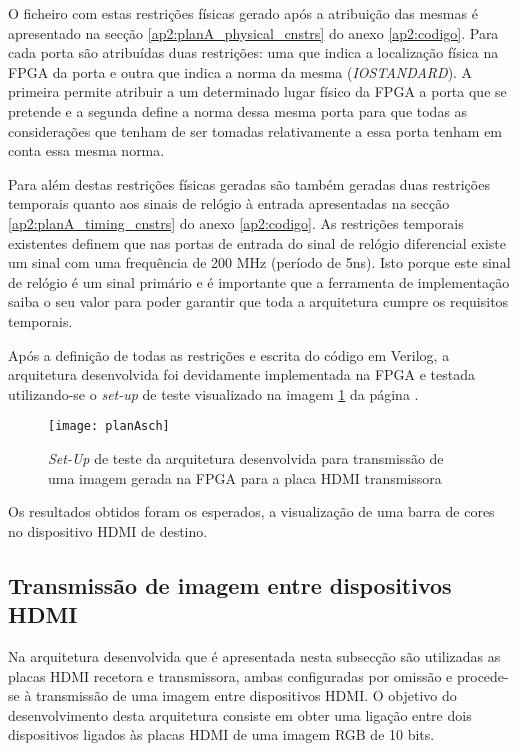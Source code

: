 O ficheiro com estas restrições físicas gerado após a atribuição das mesmas é apresentado na secção \ref{ap2:planA_physical_cnstrs} do anexo \ref{ap2:codigo}. Para cada porta são atribuídas duas restrições: uma que indica a localização física na FPGA da porta e outra que indica a norma da mesma (\textit{IOSTANDARD}). A primeira permite atribuir a um determinado lugar físico da FPGA a porta que se pretende e a segunda define a norma dessa mesma porta para que todas as considerações que tenham de ser tomadas relativamente a essa porta tenham em conta essa mesma norma.

Para além destas restrições físicas geradas são também geradas duas restrições temporais quanto aos sinais de relógio à entrada apresentadas na secção \ref{ap2:planA_timing_cnstrs} do anexo \ref{ap2:codigo}. As restrições temporais existentes definem que nas portas de entrada do sinal de relógio diferencial existe um sinal com uma frequência de 200 MHz (período de 5ns). Isto porque este sinal de relógio é um sinal primário e é importante que a ferramenta de implementação saiba o seu valor para poder garantir que toda a arquitetura cumpre os requisitos temporais.

Após a definição de todas as restrições e escrita do código em Verilog, a arquitetura desenvolvida foi devidamente implementada na FPGA e testada utilizando-se o \textit{set-up} de teste visualizado na imagem \ref{fig:planA_sch} da página \pageref{fig:planA_sch}.

\begin{figure}[h!]
	\begin{center}
		\leavevmode
		\texttt{[image: planAsch]}
		\caption{\textit{Set-Up} de teste da arquitetura desenvolvida para transmissão de uma imagem gerada na FPGA para a placa HDMI transmissora}
		\label{fig:planA_sch}
	\end{center}
\end{figure}

Os resultados obtidos foram os esperados, a visualização de uma barra de cores no dispositivo HDMI de destino.

\subsection{Transmissão de imagem entre dispositivos HDMI} \label{subsub:planB}

Na arquitetura desenvolvida que é apresentada nesta subsecção são utilizadas as placas HDMI recetora e transmissora, ambas configuradas por omissão e procede-se à transmissão de uma imagem entre dispositivos HDMI. O objetivo do desenvolvimento desta arquitetura consiste em obter uma ligação entre dois dispositivos ligados às placas HDMI de uma imagem RGB de 10 bits.


